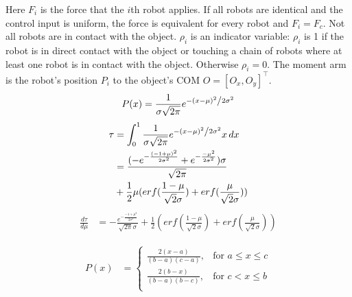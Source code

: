 Here $F_i$ is the force that the $i$th robot applies.  If all robots are identical and the control input is uniform, the force is equivalent for every robot and $F_i = F_c$.
Not all robots are in contact with the object.  $\rho_i$ is an indicator variable: $\rho_i$ is 1 if the robot is in direct contact with the object or touching a chain of robots where at least one robot is in contact with the object. Otherwise $\rho_i = 0$.
The moment arm is the robot's position $P_i$ to the object's COM $O=[O_x,O_y]^{\top}$.
\begin{equation}
P(x) = \frac{1}{{\sigma \sqrt {2\pi } }}e^{{{ - \left( {x - \mu } \right)^2 } \mathord{\left/ {\vphantom {{ - \left( {x - \mu } \right)^2 } {2\sigma ^2 }}} \right. \kern-\nulldelimiterspace} {2\sigma ^2 }}}
\end{equation}
\begin{align} \nonumber
\tau &= \int_0^1\frac{1}{{\sigma \sqrt {2\pi } }}e^{{{ - \left( {x - \mu } \right)^2 } \mathord{\left/ {\vphantom {{ - \left( {x - \mu } \right)^2 } {2\sigma ^2 }}} \right. \kern-\nulldelimiterspace} {2\sigma ^2 }}} x \, dx\\ \nonumber
&= \frac{(-e^{-\frac{(-1+\mu)^2}{2\sigma^2}}+e^{-\frac{-\mu^2}{2\sigma^2}})\sigma}{\sqrt{2\pi}}\\ 
&+ \frac{1}{2}\mu(erf(\frac{1-\mu}{\sqrt{2}\sigma})+erf(\frac{\mu}{\sqrt{2}\sigma})) 
\end{align}
\begin{align} 
\frac{d\tau}{d\mu} &= -\frac{e^{-\frac{{-1+\mu}^2}{2\sigma^2}}}{\sqrt{2\pi}\sigma} + \frac{1}{2}(erf(\frac{1-\mu}{\sqrt{2}\sigma})+erf(\frac{\mu}{\sqrt{2}\sigma})) 
\end{align}


\begin{align}
P(x) &=  \left\{
\begin{array}{ll}
    \frac{2(x-a)}{(b-a)(c-a)}, &  \textrm{for   } a \leq x \leq c\\
     \frac{2(b-x)}{(b-a)(b-c)}, &  \textrm{for   } c < x \leq b\\
\end{array} 
\right.
\end{align}
